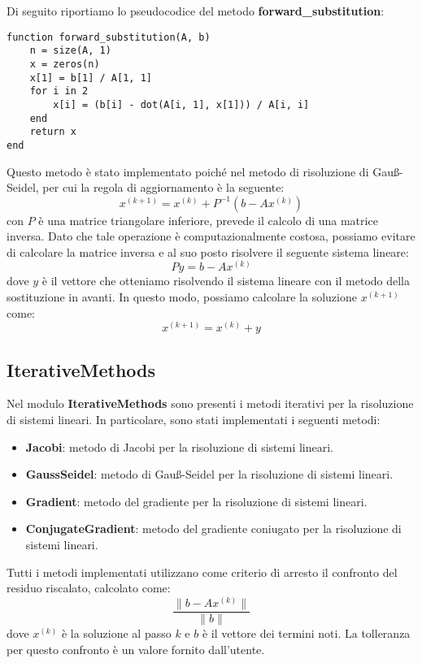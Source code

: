 Di seguito riportiamo lo pseudocodice del metodo \textbf{forward\_substitution}:
\begin{verbatim}
function forward_substitution(A, b)
    n = size(A, 1)
    x = zeros(n)
    x[1] = b[1] / A[1, 1]
    for i in 2
        x[i] = (b[i] - dot(A[i, 1], x[1])) / A[i, i]
    end
    return x
end
\end{verbatim}
Questo metodo è stato implementato poiché nel metodo di risoluzione di Gauß-Seidel,
per cui la regola di aggiornamento è la seguente:
\begin{equation}
    x^{(k+1)} = x^{(k)} + P^{-1}(b - Ax^{(k)})
\end{equation}
con $P$ è una matrice triangolare inferiore, prevede il calcolo di una matrice
inversa. Dato che tale operazione è computazionalmente costosa, possiamo evitare
di calcolare la matrice inversa e al suo posto risolvere il seguente sistema
lineare:
\begin{equation}
    Py = b - Ax^{(k)}
\end{equation}
dove $y$ è il vettore che otteniamo risolvendo il sistema lineare con il metodo
della sostituzione in avanti. In questo modo, possiamo calcolare la soluzione
$x^{(k+1)}$ come:
\begin{equation}
    x^{(k+1)} = x^{(k)} + y
\end{equation} 

\subsection{IterativeMethods}
Nel modulo \textbf{IterativeMethods} sono presenti i metodi iterativi per la
risoluzione di sistemi lineari. In particolare, sono stati implementati i seguenti
metodi:
\begin{itemize}
    \item \textbf{Jacobi}: metodo di Jacobi per la risoluzione di sistemi lineari.
    \item \textbf{GaussSeidel}: metodo di Gauß-Seidel per la risoluzione di
          sistemi lineari.
    \item \textbf{Gradient}: metodo del gradiente per la risoluzione di sistemi
          lineari.
    \item \textbf{ConjugateGradient}: metodo del gradiente coniugato per la
          risoluzione di sistemi lineari.
\end{itemize}

Tutti i metodi implementati utilizzano come criterio di arresto il confronto del
residuo riscalato, calcolato come:
\begin{equation}
    \frac{\|b - Ax^{(k)}\|}{\|b\|}
\end{equation}
dove $x^{(k)}$ è la soluzione al passo $k$ e $b$ è il vettore dei termini noti.
La tolleranza per questo confronto è un valore fornito dall'utente.

